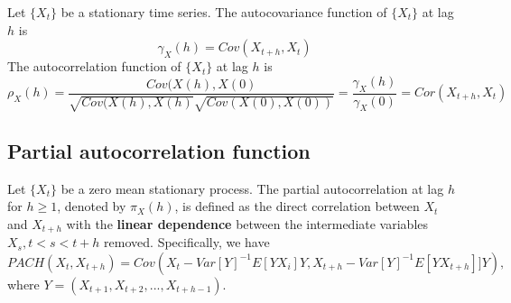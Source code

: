 \begin{definition}
	Let $\{X_t\}$ be a stationary time series. The autocovariance function of $\{X_t\}$ at lag $h$ is
	$$\gamma_X(h) = Cov(X_{t+h},X_t)$$
	The autocorrelation function of $\{X_t\}$ at lag $h$ is
	$$\rho_X(h) = \frac{Cov(X(h),X(0)}{\sqrt{Cov(X(h),X(h)}\sqrt{Cov(X(0),X(0))}} =  \frac{\gamma_X(h)}{\gamma_X(0)} = Cor(X_{t+h},X_t)$$
\end{definition}


\subsection{Partial autocorrelation function}\label{ch:time-series-analysis:sec:PartialAutocorrelationFunction}



\begin{definition}\cite[100]{subbaRao2017timeSeries}
Let $\{X_t\}$ be a zero mean stationary process. The partial autocorrelation at lag $h$ for $h\geq 1$, denoted by $\pi_X(h)$, is defined as the direct correlation between $X_t$ and $X_{t+h}$ with the \textbf{linear dependence} between the intermediate variables $X_s, t<s<t+h$ removed. Specifically, we have  
	$$PACH(X_t,X_{t+h}) = Cov(X_t - Var[Y]^{-1}E[YX_i]Y,X_{t+h}-Var[Y]^{-1}E[YX_{t+h}]]Y),$$
where $Y = (X_{t+1},X_{t+2},...,X_{t+h-1}).$	
\end{definition}




